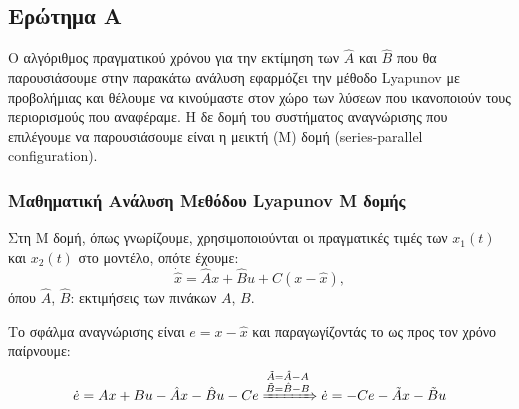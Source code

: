 \documentclass[12pt]{article} %
\numberwithin{equation}{section}  %
\begin{document}
\subsection{Ερώτημα Α}

Ο αλγόριθμος πραγματικού χρόνου για την εκτίμηση των $\hat{A}$ και $\hat{B}$ που θα παρουσιάσουμε στην παρακάτω ανάλυση εφαρμόζει την μέθοδο Lyapunov με προβολή\textemdash μιας και θέλουμε να κινούμαστε στον χώρο των λύσεων που ικανοποιούν τους περιορισμούς που αναφέραμε. Η δε δομή του συστήματος αναγνώρισης που επιλέγουμε να παρουσιάσουμε είναι η μεικτή (Μ) δομή (series-parallel configuration).

\subsubsection{Μαθηματική Ανάλυση Μεθόδου Lyapunov Μ δομής}

Στη Μ δομή, όπως γνωρίζουμε, χρησιμοποιούνται οι πραγματικές τιμές των \( x_1(t)\) και \( x_2(t) \) στο μοντέλο, οπότε έχουμε:
\begin{equation}\label{eq:estim_sys}
\dot{\hat{x}} = \hat{A}x + \hat{B}u + C(x - \hat{x}),
\end{equation}
όπου $\hat{A}$, $\hat{B}$: εκτιμήσεις των πινάκων $A$, $B$.

\vspace{+8pt}

\noindent\textbullet\hspace{0.2em} Το σφάλμα αναγνώρισης είναι $e = x - \hat{x}$ και παραγωγίζοντάς το ως προς τον χρόνο παίρνουμε:
\begin{equation}\label{eq:error_dot}
\dot{e} = A x + B u - \hat{A} x - \hat{B}u - Ce \xRightarrow{\substack{\tilde{A} = \hat{A} - A \\ \tilde{B} = \hat{B} - B}}
\dot{e} = - C e - \tilde{A} x - \tilde{B}u
\end{equation}
\end{document}
